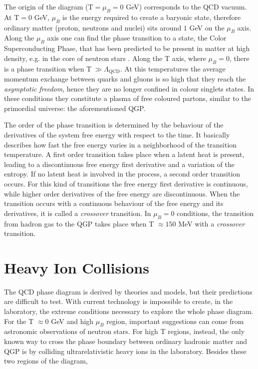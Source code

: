 The origin of the diagram (T$=\mu_{B}=0$ GeV) corresponds to the QCD vacuum. At T$=0$ GeV, $\mu_{B}$ is 
the energy required to create a baryonic state, therefore ordinary matter (proton, neutrons and nuclei)
sits around $1$ GeV on the $\mu_{B}$ axis. Along the $\mu_{B}$ axis one can find the phase transition to a state,
the Color Superconducting Phase, that has been predicted to be present in matter at high density,
e.g. in  the core of neutron stars \cite{csp}.
Along the T axis, where $\mu_{B}=0$, there is a phase transition when T$\ \gg \Lambda_{\mathrm{QCD}}$. 
At this temperatures the average momentum exchange between quarks and gluons is so high that they reach
the \textit{asymptotic freedom}, hence they are no longer confined in colour singlets states.
In these conditions they constitute a plasma of free coloured partons, similar to the primordial 
universe: the aforementioned QGP.

The order of the phase transition is determined by the behaviour of the derivatives of the system free energy
with respect to the time. It basically describes how fast the free energy varies in a
neighborhood of the transition temperature.
A first order transition takes place when a latent heat is present, leading to a discontinuous free
energy first derivative and a variation of the entropy.
If no latent heat is involved in the process, a second order transition occurs. For this kind of
transitions the free energy first derivative is continuous, while higher order derivatives of the free
energy are discontinuous.
When the transition occurs with a continuous behaviour of the free energy and its derivatives,
it is called a \textit{crossover} transition.
In $\mu_{B}=0$ conditions, the transition from hadron gas to the QGP takes place when T
$\approx 150$ MeV with a \textit{crossover} transition.

%
%
\section{Heavy Ion Collisions}
\label{sec:1.3}

The QCD phase diagram is derived by theories and models, but their predictions are difficult to test.
With current technology is impossible to create, in the laboratory, the extreme conditions necessary
to explore the whole phase diagram.
For the T $\approx0$ GeV and high $\mu_{B}$ region, important suggestions can come from astronomic
observations of neutron stars. 
For high T regions, instead, the only known way to cross the phase boundary between ordinary hadronic
matter and QGP is by colliding ultrarelativistic heavy ions in the laboratory.
Besides these two regions of the diagram,  


